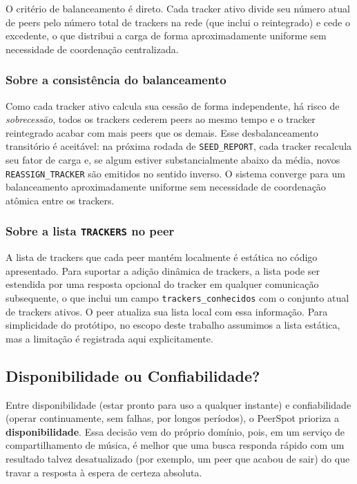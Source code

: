 \documentclass[12pt, a4paper]{article}
\begin{document}
O critério de balanceamento é direto. Cada tracker ativo divide seu número atual de peers pelo número total de trackers na rede (que inclui o reintegrado) e cede o excedente, o que distribui a carga de forma aproximadamente uniforme sem necessidade de coordenação centralizada.

\subsubsection*{Sobre a consistência do balanceamento}
Como cada tracker ativo calcula sua cessão de forma independente, há risco de \textit{sobrecessão}, todos os trackers cederem peers ao mesmo tempo e o tracker reintegrado acabar com mais peers que os demais. Esse desbalanceamento transitório é aceitável: na próxima rodada de \texttt{SEED\_REPORT}, cada tracker recalcula seu fator de carga e, se algum estiver substancialmente abaixo da média, novos \texttt{REASSIGN\_TRACKER} são emitidos no sentido inverso. O sistema converge para um balanceamento aproximadamente uniforme sem necessidade de coordenação atômica entre os trackers.

\subsubsection*{Sobre a lista \texttt{TRACKERS} no peer}
A lista de trackers que cada peer mantém localmente é estática no código apresentado. Para suportar a adição dinâmica de trackers, a lista pode ser estendida por uma resposta opcional do tracker em qualquer comunicação subsequente, o que inclui um campo \texttt{trackers\_conhecidos} com o conjunto atual de trackers ativos. O peer atualiza sua lista local com essa informação. Para simplicidade do protótipo, no escopo deste trabalho assumimos a lista estática, mas a limitação é registrada aqui explicitamente.

\subsection{Disponibilidade ou Confiabilidade?}\label{sec:disp_conf}

Entre disponibilidade (estar pronto para uso a qualquer instante) e confiabilidade (operar continuamente, sem falhas, por longos períodos), o PeerSpot prioriza a \textbf{disponibilidade}. Essa decisão vem do próprio domínio, pois, em um serviço de compartilhamento de música, é melhor que uma busca responda rápido com um resultado talvez desatualizado (por exemplo, um peer que acabou de sair) do que travar a resposta à espera de certeza absoluta.
\end{document}
